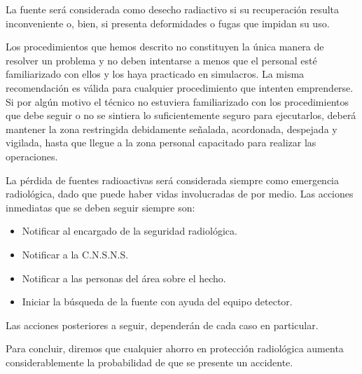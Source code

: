 
La fuente será considerada como desecho radiactivo si su recuperación resulta inconveniente o, bien, si presenta deformidades o fugas que impidan su uso.

Los procedimientos que hemos descrito no constituyen la única manera de resolver un problema y no deben intentarse a menos que el personal esté familiarizado con ellos y los haya practicado en simulacros. La misma recomendación es válida para cualquier procedimiento que intenten emprenderse. Si por algún motivo el técnico no estuviera familiarizado con los procedimientos que debe seguir o no se sintiera lo suficientemente seguro para ejecutarlos, deberá mantener la zona restringida debidamente señalada, acordonada, despejada y vigilada, hasta que llegue a la zona personal capacitado para realizar las operaciones.

La pérdida de fuentes radioactivas será considerada siempre como emergencia radiológica, dado que puede haber vidas involucradas de por medio. Las acciones inmediatas que se deben seguir siempre son:
\begin{itemize}
    \item Notificar al encargado de la seguridad radiológica.
    \item Notificar a la C.N.S.N.S.
    \item Notificar a las personas del área sobre el hecho.
    \item Iniciar la búsqueda de la fuente con ayuda del equipo detector.
\end{itemize}

Las acciones posteriores a seguir, dependerán de cada caso en particular.

Para concluir, diremos que cualquier ahorro en protección radiológica aumenta considerablemente la probabilidad de que se presente un accidente.
